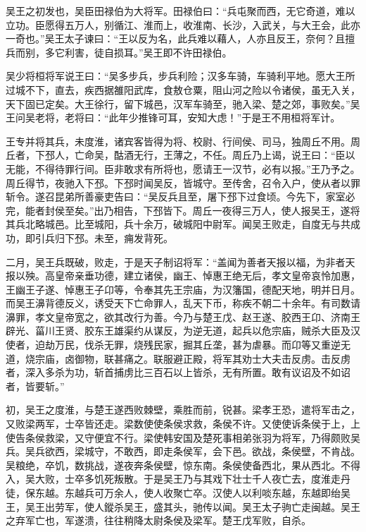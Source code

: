 \documentclass[12pt,UTF8]{ctexbook}
\begin{document}
吴王之初发也，吴臣田禄伯为大将军。田禄伯曰：“兵屯聚而西，无它奇道，难以立功。臣愿得五万人，别循江、淮而上，收淮南、长沙，入武关，与大王会，此亦一奇也。”吴王太子谏曰：“王以反为名，此兵难以藉人，人亦且反王，奈何？且擅兵而别，多它利害，徒自损耳。”吴王即不许田禄伯。



吴少将桓将军说王曰：“吴多步兵，步兵利险；汉多车骑，车骑利平地。愿大王所过城不下，直去，疾西据雒阳武库，食敖仓粟，阻山河之险以令诸侯，虽无入关，天下固已定矣。大王徐行，留下城邑，汉军车骑至，驰入梁、楚之郊，事败矣。”吴王问吴老将，老将曰：“此年少推锋可耳，安知大虑！”于是王不用桓将军计。



王专并将其兵，未度淮，诸宾客皆得为将、校尉、行间侯、司马，独周丘不用。周丘者，下邳人，亡命吴，酤酒无行，王薄之，不任。周丘乃上谒，说王曰：“臣以无能，不得待罪行间。臣非敢求有所将也，愿请王一汉节，必有以报。”王乃予之。周丘得节，夜驰入下邳。下邳时闻吴反，皆城守。至传舍，召令入户，使从者以罪斩令。遂召昆弟所善豪吏告曰：“吴反兵且至，屠下邳下过食顷。今先下，家室必完，能者封侯至矣。”出乃相告，下邳皆下。周丘一夜得三万人，使人报吴王，遂将其兵北略城邑。比至城阳，兵十余万，破城阳中尉军。闻吴王败走，自度无与共成功，即引兵归下邳。未至，痈发背死。



二月，吴王兵既破，败走，于是天子制诏将军：“盖闻为善者天报以福，为非者天报以殃。高皇帝亲垂功德，建立诸侯，幽王、悼惠王绝无后，孝文皇帝哀怜加惠，王幽王子遂、悼惠王子卬等，令奉其先王宗庙，为汉籓国，德配天地，明并日月。而吴王濞背德反义，诱受天下亡命罪人，乱天下币，称疾不朝二十余年。有司数请濞罪，孝文皇帝宽之，欲其改行为善。今乃与楚王戊、赵王遂、胶西王卬、济南王辟光、菑川王贤、胶东王雄渠约从谋反，为逆无道，起兵以危宗庙，贼杀大臣及汉使者，迫劫万民，伐杀无罪，烧残民家，掘其丘垄，甚为虐暴。而卬等又重逆无道，烧宗庙，卤御物，联甚痛之。联服避正殿，将军其劝士大夫击反虏。击反虏者，深入多杀为功，斩首捕虏比三百石以上皆杀，无有所置。敢有议诏及不如诏者，皆要斩。”



初，吴王之度淮，与楚王遂西败棘壁，乘胜而前，锐甚。梁孝王恐，遣将军击之，又败梁两军，士卒皆还走。梁数使使条侯求救，条侯不许。又使使诉条侯于上，上使告条侯救梁，又守便宜不行。梁使韩安国及楚死事相弟张羽为将军，乃得颇败吴兵。吴兵欲西，梁城守，不敢西，即走条侯军，会下邑。欲战，条侯壁，不肯战。吴粮绝，卒饥，数挑战，遂夜奔条侯壁，惊东南。条侯使备西北，果从西北。不得入，吴大败，士卒多饥死叛散。于是吴王乃与其戏下壮士千人夜亡去，度淮走丹徒，保东越。东越兵可万余人，使人收聚亡卒。汉使人以利啖东越，东越即绐吴王，吴王出劳军，使人鏦杀吴王，盛其头，驰传以闻。吴王太子驹亡走闽越。吴王之弃军亡也，军遂溃，往往稍降太尉条侯及梁军。楚王戊军败，自杀。
\end{document}
